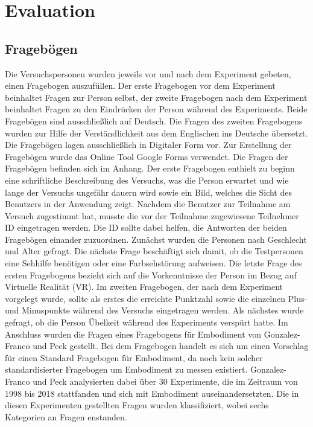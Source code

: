 \chapter{Evaluation}

\section{Fragebögen}
Die Versuchspersonen wurden jeweils vor und nach dem Experiment gebeten, einen Fragebogen auszufüllen. Der erste Fragebogen vor dem Experiment beinhaltet Fragen zur Person selbst, der zweite Fragebogen nach dem Experiment beinhaltet Fragen zu den Eindrücken der Person während des Experiments. Beide Fragebögen sind ausschließlich auf Deutsch. Die Fragen des zweiten Fragebogens wurden zur Hilfe der Verständlichkeit aus dem Englischen ins Deutsche übersetzt. Die Fragebögen lagen ausschließlich in Digitaler Form vor. Zur Erstellung der Fragebögen wurde das Online Tool Google Forms verwendet. Die Fragen der Fragebögen befinden sich im Anhang.
Der erste Fragebogen enthielt zu beginn eine schriftliche Beschreibung des Versuchs, was die Person erwartet und wie lange der Versuchs ungefähr dauern wird sowie ein Bild, welches die Sicht des Benutzers in der Anwendung zeigt. Nachdem die Benutzer zur Teilnahme am Versuch zugestimmt hat, musste die vor der Teilnahme zugewiesene Teilnehmer ID eingetragen werden. Die ID sollte dabei helfen, die Antworten der beiden Fragebögen einander zuzuordnen. Zunächst wurden die Personen nach Geschlecht und Alter gefragt. Die nächste Frage beschäftigt sich damit, ob die Testpersonen eine Sehhilfe benötigen oder eine Farbsehstörung aufweisen. Die letzte Frage des ersten Fragebogens bezieht sich auf die Vorkenntnisse der Person im Bezug auf Virtuelle Realität (VR). 
Im zweiten Fragebogen, der nach dem Experiment vorgelegt wurde, sollte als erstes die erreichte Punktzahl sowie die einzelnen Plus- und Minuspunkte während des Versuchs eingetragen werden. Als nächstes wurde gefragt, ob die Person Übelkeit während des Experiments verspürt hatte.
Im Anschluss wurden die Fragen eines Fragebogens für Embodiment von Gonzalez-Franco und Peck \cite{Gonzalez-Franco2018} gestellt. Bei dem Fragebogen handelt es sich um einen Vorschlag für einen Standard Fragebogen für Embodiment, da noch kein solcher standardisierter Fragebogen um Embodiment zu messen existiert. Gonzalez-Franco und Peck analysierten dabei über 30 Experimente, die im Zeitraum von 1998 bis 2018 stattfanden und sich mit Embodiment auseinandersetzten. Die in diesen Experimenten gestellten Fragen wurden klassifiziert, wobei sechs Kategorien an Fragen enstanden.
